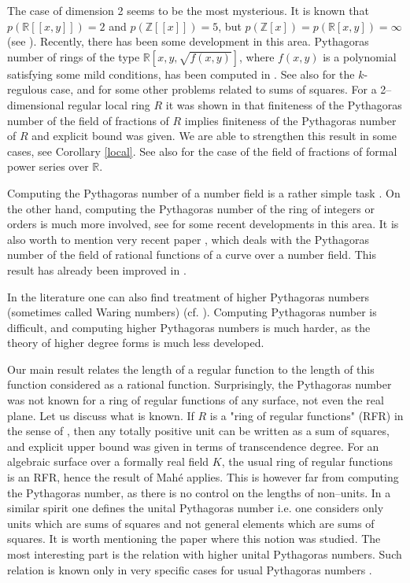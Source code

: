 \documentclass[12pt,reqno]{amsart}   	%
\theoremstyle{obs}
\theoremstyle{prob}
\theoremstyle{conj}
\theoremstyle{remark}
\newcommand{\Z}{\mathbb{Z}}
\newcommand{\R}{\mathbb{R}}
\begin{document}
The case of dimension 2 seems to be the most mysterious. It is known that $p(\R[[x,y]])=2$ and $p(\Z[[x]])=5$, but $p(\Z[x])=p(\R[x,y])=\infty$ (see \cite{cldr1982}).  Recently, there has been some development in this area. Pythagoras number of rings of the type $\R[x,y,\sqrt{f(x,y)}]$, where $f(x,y)$ is a polynomial satisfying some mild conditions, has been computed in \cite{bk2024}. See also \cite{bk2023} for the $k$-regulous case, and \cite{vill2021} for some other problems related to sums of squares. For a 2--dimensional regular local ring $R$ it was shown in \cite{scheiderer2001} that finiteness of the Pythagoras number of the field of fractions of $R$ implies finiteness of the Pythagoras number of $R$ and explicit bound was given. We are able to strengthen this result in some cases, see Corollary \ref{local}. See also \cite{bz2024} for the case of the field of fractions of formal power series over $\R$.

Computing the Pythagoras number of a number field is a rather simple task \cite[Chapter 7, Example 1.4]{pfister1995}. On the other hand, computing the Pythagoras number of the ring of integers or orders is much more involved, see \cite{dgmy2025, dmr2021, kc2018, krasensky2022, krs2022, ky2023, tinkova2023} for some recent developments in this area. It is also worth to mention very recent paper \cite{pop2023}, which deals with the Pythagoras number of the field of rational functions of a curve over a number field. This result has already been improved in \cite{benoist2025}.

In the literature one can also find treatment of higher Pythagoras numbers (sometimes called Waring numbers) (cf. \cite{becker1982, grimm2015, km2024, kv2023}). Computing Pythagoras number is difficult, and computing higher Pythagoras numbers is much harder, as the theory of higher degree forms is much less developed.


Our main result relates the length of a regular function to the length of this function considered as a rational function. Surprisingly, the Pythagoras number was not known for a ring of regular functions of any surface, not even the real plane. Let us discuss what is known. If $R$ is a "ring of regular functions" (RFR) in the sense of \cite{mahe1990}, then any totally positive unit can be written as a sum of squares, and explicit upper bound was given in terms of transcendence degree. For an algebraic surface over a formally real field $K$, the usual ring of regular functions is an RFR, hence the result of Mah\'e applies. This is however far from computing the Pythagoras number, as there is no control on the lengths of non--units. In a similar spirit one defines the unital Pythagoras number i.e. one considers only units which are sums of squares and not general elements which are sums of squares. It is worth mentioning the paper \cite[Theorem 5.17]{bp1996} where this notion was studied. The most interesting part is the relation with higher unital Pythagoras numbers. Such relation is known only in  very specific cases for usual Pythagoras numbers \cite[Conjecture 5.2]{kv2023}. 
\end{document}
